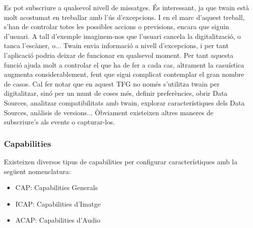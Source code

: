 \documentclass[letterpaper,11pt,catalan]{sphinxmanual}
\begin{document}
\begin{sphinxVerbatim}[commandchars=\\\{\}]
 
           
           
              
          
          
        \PYG{p}{[}\PYG{p}{]} \PYG{p}{[}\PYG{p}{]} \PYG{p}{[}\PYG{p}{]}

\end{sphinxVerbatim}

Es pot subscriure a qualsevol nivell de missatges. És interessant, ja que twain
està molt acostumat en treballar amb l'ús d'excepcions. I en el marc d'aquest treball,
s'han de controlar totes les possibles accions o previsions, encara que siguin d'usuari.
A tall d'exemple imaginem-nos que l'usuari cancela la digitalització, o tanca l'escàner, o...
Twain envia informació a nivell d'excepcions, i per tant l'aplicació podria deixar de funcionar
en qualsevol moment. Per tant aquesta funció ajuda molt a controlar el que ha de fer a cada cas,
altrament la casuística augmenta considerablement, fent que sigui complicat contemplar el
gran nombre de casos. Cal fer notar que en aquest TFG no només s'utilitza twain per digitalitzar, sinó per un munt
de coses més, definir preferències, obrir Data Sources, analitzar compatibilitats amb twain,
explorar característiques dels Data Sources, anàlisis de versions...
Òbviament existeixen altres maneres de subscriure's als events o capturar-los.


\subsubsection{Capabilities}
\label{\detokenize{index:capabilities}}
Existeixen diversos tipus de capabilities per configurar característiques amb la següent nomenclatura:
\begin{itemize}
\item {} 
CAP: Capabilities Generals

\item {} 
ICAP: Capabilities d'Imatge

\item {} 
ACAP: Capabilities d'Audio

\end{itemize}
\end{document}

